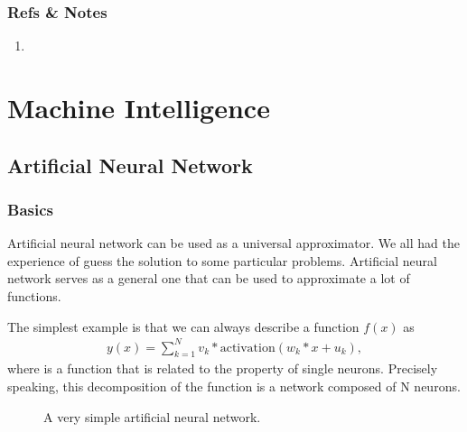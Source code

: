 \documentclass[letterpaper,10pt,english]{sphinxmanual}
\begin{document}
\subsection{Refs \& Notes}
\label{\detokenize{random-walks/random-walks:refs-notes}}\begin{enumerate}
\item {} 

\end{enumerate}


\chapter{Machine Intelligence}
\label{\detokenize{machine-intelligence/index::doc}}\label{\detokenize{machine-intelligence/index:machine-intelligence}}

\section{Artificial Neural Network}
\label{\detokenize{machine-intelligence/ann::doc}}\label{\detokenize{machine-intelligence/ann:artificial-neural-network}}

\subsection{Basics}
\label{\detokenize{machine-intelligence/ann:basics}}
Artificial neural network can be used as a universal approximator. We all had the experience of guess the solution to some particular problems. Artificial neural network serves as a general one that can be used to approximate a lot of functions.

The simplest example is that we can always describe a function \(f(x)\) as
\begin{equation*}
\begin{split}y(x) = \sum_{k=1}^{N} v_k * \text{activation}( w_k * x + u_k ),\end{split}
\end{equation*}
where  is a function that is related to the property of single neurons. Precisely speaking, this decomposition of the function is a network composed of N neurons.

\begin{figure}[htbp]
\centering
\capstart

\noindent{}
\caption{A very simple artificial neural network.}\label{\detokenize{machine-intelligence/ann:id1}}\end{figure}
\end{document}
